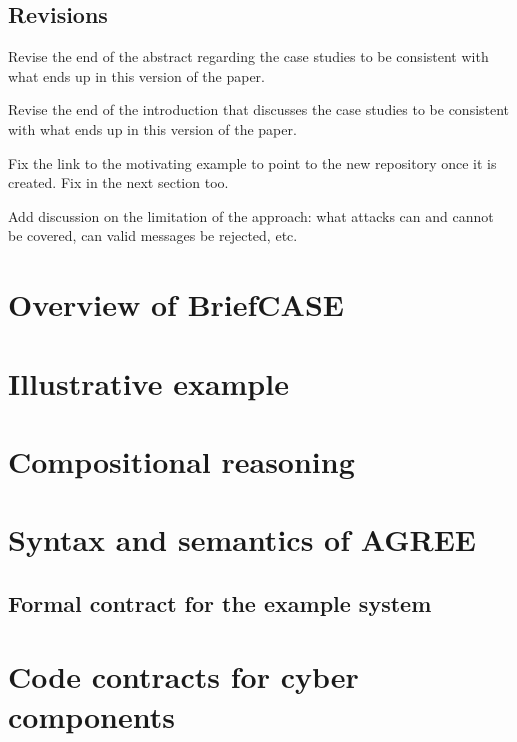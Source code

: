 \documentclass[global,twocolumn,keeplastbox]{svjour}
\begin{document}
\subsection{Revisions}
\begin{compactitem}
  \item Revise the end of the abstract regarding the case studies to be consistent with what ends up in this version of the paper.
  \item Revise the end of the introduction that discusses the case studies to be consistent with what ends up in this version of the paper.
  \item Fix the link to the motivating example to point to the new repository once it is created. Fix in the next section too.
  \item Add discussion on the limitation of the approach: what attacks can and cannot be covered, can valid messages be rejected, etc.
\end{compactitem}
\fi

\section{Overview of BriefCASE}
\label{sec:overview}


\section{Illustrative example}
\label{sec:example}


\section{Compositional reasoning}
\label{sec:agree}


\section{Syntax and semantics of AGREE}
\label{agree-semantics}


\subsection{Formal contract for the example system}


\section{Code contracts for cyber components}
\label{sec:code-contracts}

\end{document}
